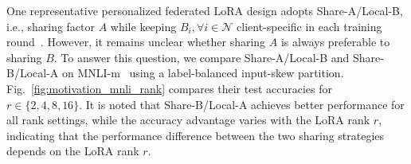 \documentclass[lettersize,journal]{IEEEtran}
\begin{document}
	One representative personalized federated LoRA design adopts Share-A/Local-B, i.e., sharing factor $A$ while keeping $B_i, \forall i \in \mathcal{N}$ client-specific in each training round~\cite{guo2025selective}. 
	However, it remains unclear whether sharing $A$ is always preferable to sharing $B$.
	To  {\color{black}answer} this question, we compare Share-A/Local-B and Share-B/Local-A on MNLI-m~\cite{wang2018glue} using a label-balanced input-skew partition.
	{}
	Fig.~\ref{fig:motivation_mnli_rank} compares their test accuracies for $r\in\{2,4,8,16\}$.
	It is noted that Share-B/Local-A achieves better performance for all rank settings, while the accuracy advantage varies with the LoRA rank $r$, indicating that the performance difference between the two sharing strategies depends on the LoRA rank $r$.
	
	
	
	
\end{document}
